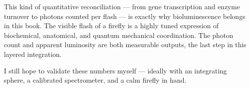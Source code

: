 \begin{commentary}
This kind of quantitative reconciliation — from gene transcription and enzyme turnover to photons counted per flash — is exactly why bioluminescence belongs in this book. The visible flash of a firefly is a highly tuned expression of biochemical, anatomical, and quantum mechanical coordination. The photon count and apparent luminosity are both measurable outputs, the last step in this layered integration.

I still hope to validate these numbers myself — ideally with an integrating sphere, a calibrated spectrometer, and a calm firefly in hand.
\end{commentary}


